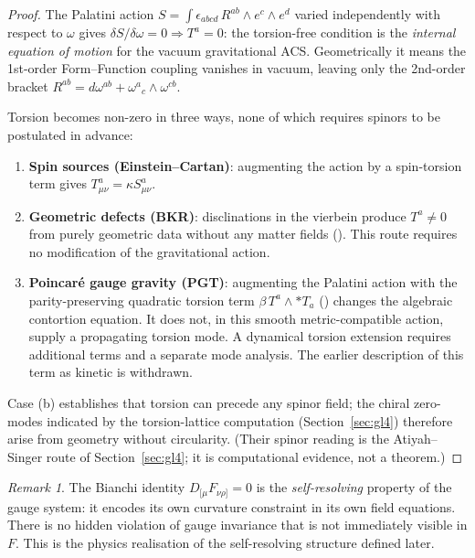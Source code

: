 \documentclass[11pt,a4paper]{article}
\theoremstyle{plain}
\theoremstyle{definition}
\theoremstyle{remark}
\newtheorem{remark}[theorem]{Remark}
\begin{document}
\begin{proof}
The Palatini action $S = \int \epsilon_{abcd}\, R^{ab} \wedge e^c \wedge e^d$
varied independently with respect to $\omega$ gives $\delta S/\delta\omega = 0
\Rightarrow T^a = 0$: the torsion-free condition is the \emph{internal equation
of motion} for the vacuum gravitational ACS.  Geometrically it means the
1st-order Form--Function coupling vanishes in vacuum, leaving only the
2nd-order bracket $R^{ab} = d\omega^{ab} + \omega^a{}_c\wedge\omega^{cb}$.

Torsion becomes non-zero in three ways, none of which requires spinors
to be postulated in advance:
\begin{enumerate}[noitemsep,label=(\alph*)]
  \item \textbf{Spin sources (Einstein--Cartan)}: augmenting the action by
    a spin-torsion term gives $T^a_{\mu\nu} = \kappa S^a_{\mu\nu}$.
  \item \textbf{Geometric defects (BKR)}: disclinations in the vierbein produce
    $T^a \neq 0$ from purely geometric data without any matter fields
    (\cite{BKR1955}).  This route requires no
    modification of the gravitational action.
  \item \textbf{Poincar\'{e} gauge gravity (PGT)}: augmenting the Palatini action
    with the parity-preserving quadratic torsion term
    $\beta\,T^a\wedge{*T_a}$ (\cite{Kibble1961,Sciama1964,Hehl1976})
    changes the algebraic contortion equation. It does not, in this smooth
    metric-compatible action, supply a propagating torsion mode. A dynamical
    torsion extension requires additional terms and a separate mode analysis.
    The earlier description of this term as kinetic is withdrawn.
\end{enumerate}
Case (b) establishes that torsion can precede any spinor field; the
chiral zero-modes indicated by the torsion-lattice computation
(Section~\ref{sec:gl4}) therefore arise from geometry without
circularity.  (Their spinor reading is the Atiyah--Singer route of
Section~\ref{sec:gl4}; it is computational evidence, not a theorem.)
\end{proof}

\begin{remark}
The Bianchi identity $D_{[\mu}F_{\nu\rho]} = 0$ is the \emph{self-resolving}
property of the gauge system: it encodes its own curvature constraint
in its own field equations.  
There is no hidden violation of gauge invariance that is not 
immediately visible in $F$.  This is the physics realisation of the 
self-resolving structure defined later.
\end{remark}
\end{document}
